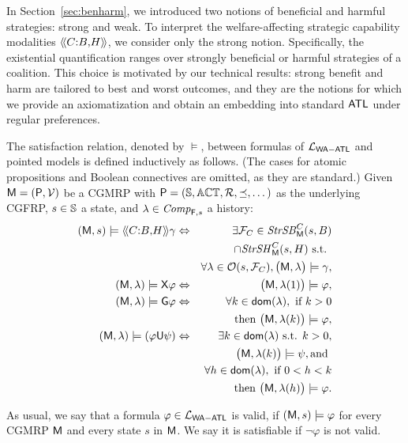 \documentclass{article}
\begin{document}
In Section~\ref{sec:benharm}, we introduced two notions of beneficial and harmful strategies: strong and weak.  
To interpret the welfare-affecting strategic capability modalities $\langle\!\langle C{:}B{,}H  \rangle\!\rangle$, we consider only the strong notion. 
Specifically, the existential quantification ranges over strongly beneficial or harmful strategies of a coalition.
This choice is motivated by our technical results: strong benefit and harm are tailored to best and worst outcomes, and they are the notions for which we provide an axiomatization and obtain an embedding into standard $\mathsf{ATL}$ under regular preferences. 

The satisfaction relation, denoted by $\models$, between formulas of $\mathcal{L}_{\mathsf{WA{-}ATL}} $ and pointed models is defined inductively as follows. 
(The cases for atomic propositions and Boolean connectives are omitted, as they are standard.)
Given  $\mathsf{M} = (\mathsf{P}, \mathcal{V})$ be a CGMRP with $\mathsf{P} = (\mathbb{S}, \mathbb{ACT}, \mathcal{R}, \preceq, \dots)$ as the underlying CGFRP, $s \in \mathbb{S}$ a state, and $\lambda \in \mathit{Comp}_{\mathsf{F},s}$ a history: 
\begin{eqnarray*}
(\M,s)  \models 
\atlbh{\Coalition}{\GroupB}{\GroupH}\gamma 
  &\Leftrightarrow &  
  \exists \js_\Coalition \in  {\JsSB^\Coalition_\M(s,\GroupB)}\\
  &&\cap {\JsSH^\Coalition_\M(s,\GroupH)}\text{ s.t. }\\
  & &\forall \history \in \outset(s, \js_\Coalition), \big(\M, \history  \big) \models \gamma , \\
  (\M,\lambda) \models \X  \varphi  
  & \Leftrightarrow  & \big( \M, \history(1) \big) \models \varphi ,\\
  (\M,\lambda) \models \henceforth  \varphi  
  & \Leftrightarrow  & \forall k \in \domain(\history), \text{ if }k>0\\
&&\text{then }\big( \M, \history(k) \big) \models \varphi ,\\
%
(\M,\lambda)  \models   ( \varphi\U\psi    )
     & \Leftrightarrow  & \exists k\in \domain(\history)  \text{ s.t. } k>0,\\
     && \big(\M,\history(k) \big)  \models \psi,  \text{and }\\
   && \forall h \in \domain(\history), \text{ if }0<h<k \\
&&\text{then } \big(\M, \history(h)   \big) \models \varphi.
\end{eqnarray*}

As usual, we say that a formula $\varphi\in \mathcal{L}_{\mathsf{WA{-}ATL}} $
is valid, if $(\mathsf{M},s)\models \varphi$
for every 
CGMRP $\mathsf{M}$
and every state $s$
in $\mathsf{M}$.
We say it is satisfiable if $\neg \varphi$
is not valid.
\end{document}
